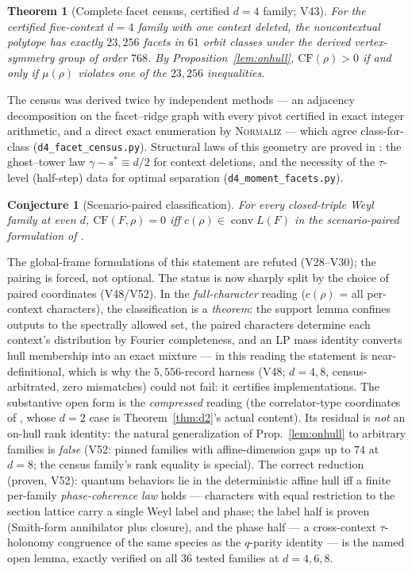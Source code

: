 \documentclass[11pt]{article}
\newtheorem{theorem}{Theorem}
\newtheorem{conjecture}{Conjecture}
\theoremstyle{definition}
\theoremstyle{remark}
\newcommand{\CF}{\mathrm{CF}}
\begin{document}
\begin{theorem}[Complete facet census, certified $d=4$ family; V43]\label{thm:census}
For the certified five-context $d=4$ family with one context deleted, the
noncontextual polytope has exactly $23{,}256$ facets in $61$ orbit classes under the
derived vertex-symmetry group of order $768$. By Proposition~\ref{lem:onhull}, $\CF(\rho)>0$ if and only if $\mu(\rho)$
violates one of the $23{,}256$ inequalities.
\end{theorem}
The census was derived twice by independent methods --- an adjacency decomposition on
the facet--ridge graph with every pivot certified in exact integer arithmetic, and a
direct exact enumeration by \textsc{Normaliz} --- which agree class-for-class
(\texttt{d4\_facet\_census.py}). Structural laws of this geometry are proved in
\cite{paperC}: the ghost--tower law $\gamma-s^*\equiv d/2$ for context deletions, and
the necessity of the $\tau$-level (half-step) data for optimal separation
(\texttt{d4\_moment\_facets.py}).

\begin{conjecture}[Scenario-paired classification]\label{conj:pair}
For every closed-triple Weyl family at even $d$, $\CF(F,\rho)=0$ iff $c(\rho)\in
\operatorname{conv}L(F)$ in the scenario-paired formulation of \cite{paperC}.
\end{conjecture}
The global-frame formulations of this statement are refuted (V28--V30); the pairing is
forced, not optional. The status is now sharply split by the choice of paired
coordinates (V48/V52). In the \emph{full-character} reading ($c(\rho)$ = all
per-context characters), the classification is a \emph{theorem}: the support lemma
confines outputs to the spectrally allowed set, the paired characters determine each
context's distribution by Fourier completeness, and an LP mass identity converts hull
membership into an exact mixture --- in this reading the statement is
near-definitional, which is why the $5{,}556$-record harness (V48; $d=4,8$,
census-arbitrated, zero mismatches) could not fail: it certifies implementations. The
substantive open form is the \emph{compressed} reading (the correlator-type
coordinates of \cite{paperC}, whose $d=2$ case is Theorem~\ref{thm:d2}'s actual
content). Its residual is \emph{not} an on-hull rank identity: the natural
generalization of Prop.~\ref{lem:onhull} to arbitrary families is \emph{false} (V52:
pinned families with affine-dimension gaps up to $74$ at $d=8$; the census family's
rank equality is special). The correct reduction (proven, V52): quantum behaviors lie
in the deterministic affine hull iff a finite per-family \emph{phase-coherence law}
holds --- characters with equal restriction to the section lattice carry a single
Weyl label and phase; the label half is proven (Smith-form annihilator plus closure),
and the phase half --- a cross-context $\tau$-holonomy congruence of the same species
as the $q$-parity identity --- is the named open lemma, exactly verified on all $36$
tested families at $d=4,6,8$.
\end{document}
